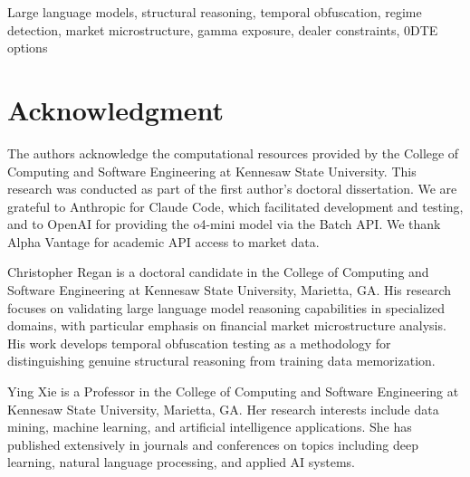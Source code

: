 \documentclass[journal]{IEEEtran}
\begin{document}
\begin{IEEEkeywords}
Large language models, structural reasoning, temporal obfuscation, regime detection, market microstructure, gamma exposure, dealer constraints, 0DTE options
\end{IEEEkeywords}



\FloatBarrier


\FloatBarrier


\FloatBarrier


\FloatBarrier


\FloatBarrier


\FloatBarrier


\section*{Acknowledgment}
The authors acknowledge the computational resources provided by the College of Computing and Software Engineering at Kennesaw State University. This research was conducted as part of the first author's doctoral dissertation. We are grateful to Anthropic for Claude Code, which facilitated development and testing, and to OpenAI for providing the o4-mini model via the Batch API. We thank Alpha Vantage for academic API access to market data.

\FloatBarrier



\begin{IEEEbiography}[]{Christopher Regan}
is a doctoral candidate in the College of Computing and Software Engineering at Kennesaw State University, Marietta, GA. His research focuses on validating large language model reasoning capabilities in specialized domains, with particular emphasis on financial market microstructure analysis. His work develops temporal obfuscation testing as a methodology for distinguishing genuine structural reasoning from training data memorization.
\end{IEEEbiography}

\begin{IEEEbiography}[]{Ying Xie}
is a Professor in the College of Computing and Software Engineering at Kennesaw State University, Marietta, GA. Her research interests include data mining, machine learning, and artificial intelligence applications. She has published extensively in journals and conferences on topics including deep learning, natural language processing, and applied AI systems.
\end{IEEEbiography}
\end{document}
